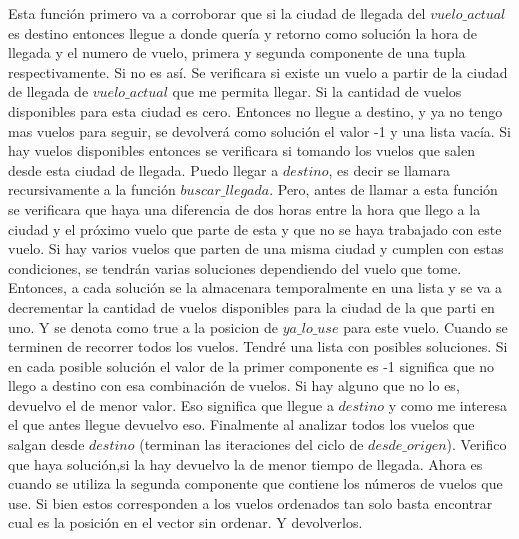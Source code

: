 \documentclass[a4paper]{article}
\begin{document}
Esta función primero va a corroborar que si la ciudad de llegada del $vuelo\_actual$ es destino entonces llegue a donde quería y retorno como solución la hora de llegada y el numero de vuelo, primera y segunda componente de una tupla respectivamente. Si no es así. Se verificara si existe un vuelo a partir de la ciudad de llegada de $vuelo\_actual$ que me permita llegar. Si la cantidad de vuelos disponibles para esta ciudad es cero. Entonces no llegue a destino, y ya no tengo mas vuelos para seguir, se devolverá como solución el valor -1 y una lista vacía. Si hay vuelos disponibles entonces se verificara si tomando los vuelos que salen desde esta ciudad de llegada. Puedo llegar a $destino$, es decir se llamara recursivamente a la función $buscar\_llegada$. Pero, antes de llamar a esta función se verificara que haya una diferencia de dos horas entre la hora que llego a la ciudad y el próximo vuelo que parte de esta y que no se haya trabajado con este vuelo. Si hay varios vuelos que parten de una misma ciudad y cumplen con estas condiciones, se tendrán varias soluciones dependiendo del vuelo que tome. Entonces, a cada solución se la almacenara temporalmente en una lista y se va a decrementar la cantidad de vuelos disponibles para la ciudad de la que parti en uno. Y se denota como true a la posicion de $ya\_lo\_use$ para este vuelo. Cuando se terminen de recorrer todos los vuelos. Tendré una lista con posibles soluciones. Si en cada posible solución el valor de la primer componente es -1 significa que no llego a destino con esa combinación de vuelos. Si hay alguno que no lo es, devuelvo el de menor valor. Eso significa que llegue a $destino$ y como me interesa el que antes llegue devuelvo eso.
Finalmente al analizar todos los vuelos que salgan desde $destino$ (terminan las iteraciones del ciclo de $desde\_origen$). Verifico que haya solución,si la hay devuelvo la de menor tiempo de llegada. Ahora es cuando se utiliza la segunda componente que contiene los números de vuelos que use. Si bien estos corresponden a los vuelos ordenados tan solo basta encontrar cual es la posición en el vector sin ordenar. Y devolverlos.  
\end{document}
